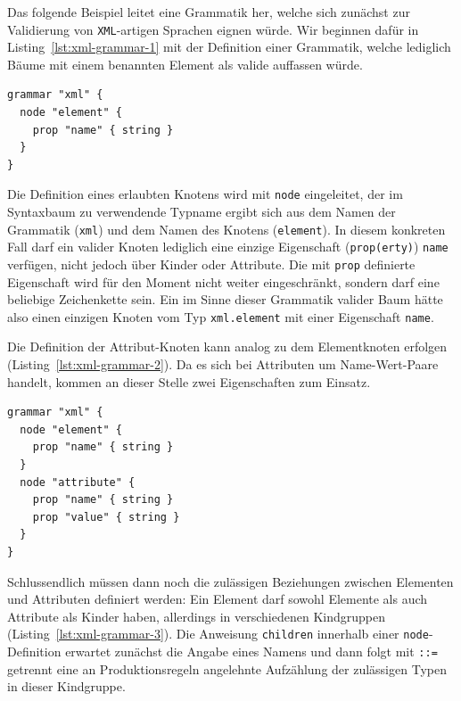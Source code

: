 \documentclass[paper=a4,fontsize=12pt,parskip=half]{scrartcl}
\begin{document}
Das folgende Beispiel leitet eine Grammatik her, welche sich zunächst zur Validierung von \texttt{XML}-artigen Sprachen eignen würde. Wir beginnen dafür in Listing~\ref{lst:xml-grammar-1} mit der Definition einer Grammatik, welche lediglich Bäume mit einem benannten Element als valide auffassen würde.

\begin{lstlisting}[float=h, label={lst:xml-grammar-1},caption={\texttt{XML} Schritt 1 - Elemente mit Namen},captionpos=b,language={Grammar}]
grammar "xml" {
  node "element" {
    prop "name" { string }
  }
}
\end{lstlisting}

Die Definition eines erlaubten Knotens wird mit \texttt{node} eingeleitet, der im Syntaxbaum zu verwendende Typname ergibt sich aus dem Namen der Grammatik (\texttt{xml}) und dem Namen des Knotens (\texttt{element}). In diesem konkreten Fall darf ein valider Knoten lediglich eine einzige Eigenschaft (\texttt{prop(erty)}) \texttt{name} verfügen, nicht jedoch über Kinder oder Attribute. Die mit \texttt{prop} definierte Eigenschaft wird für den Moment nicht weiter eingeschränkt, sondern darf eine beliebige Zeichenkette sein. Ein im Sinne dieser Grammatik valider Baum hätte also einen einzigen Knoten vom Typ \texttt{xml.element} mit einer Eigenschaft \texttt{name}.

Die Definition der Attribut-Knoten kann analog zu dem Elementknoten erfolgen (Listing~\ref{lst:xml-grammar-2}). Da es sich bei Attributen um Name-Wert-Paare handelt, kommen an dieser Stelle zwei Eigenschaften zum Einsatz.

\begin{lstlisting}[float=h, label={lst:xml-grammar-2},caption={\texttt{XML} Schritt 2 - Elemente mit Namen, Attribute},captionpos=b,language={Grammar}]
grammar "xml" {
  node "element" {
    prop "name" { string }
  }
  node "attribute" {
    prop "name" { string }
    prop "value" { string }
  }
}
\end{lstlisting}

Schlussendlich müssen dann noch die zulässigen Beziehungen zwischen Elementen und Attributen definiert werden: Ein Element darf sowohl Elemente als auch Attribute als Kinder haben, allerdings in verschiedenen Kindgruppen (Listing~\ref{lst:xml-grammar-3}). Die Anweisung \texttt{children} innerhalb einer \texttt{node}-Definition erwartet zunächst die Angabe eines Namens und dann folgt mit \texttt{::=} getrennt eine an Produktionsregeln angelehnte Aufzählung der zulässigen Typen in dieser Kindgruppe.
\end{document}
